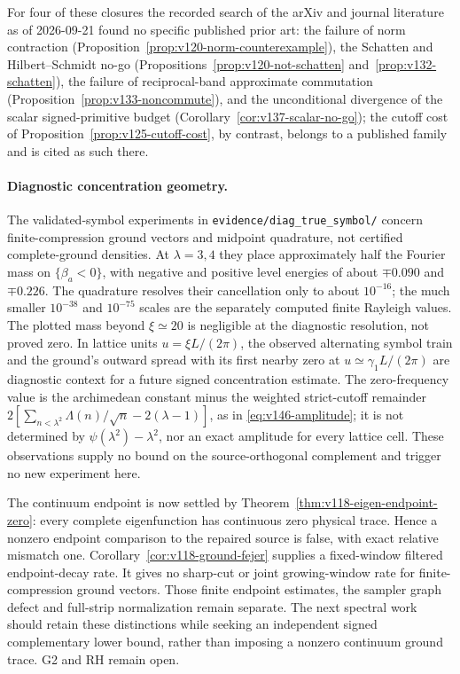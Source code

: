\documentclass[11pt]{article}
\theoremstyle{remark}
\begin{document}
For four of these closures the recorded search of the arXiv and journal literature
as of 2026-09-21 found no specific published prior art: the failure of
norm contraction (Proposition~\ref{prop:v120-norm-counterexample}), the
Schatten and Hilbert--Schmidt no-go
(Propositions~\ref{prop:v120-not-schatten} and~\ref{prop:v132-schatten}),
the failure of reciprocal-band approximate commutation
(Proposition~\ref{prop:v133-noncommute}), and the unconditional
divergence of the scalar signed-primitive budget
(Corollary~\ref{cor:v137-scalar-no-go}); the cutoff cost of
Proposition~\ref{prop:v125-cutoff-cost}, by contrast, belongs to a
published family and is cited as such there.

\paragraph{Diagnostic concentration geometry.}
The validated-symbol experiments in
\nolinkurl{evidence/diag_true_symbol/} concern finite-compression ground
vectors and midpoint quadrature, not certified complete-ground densities.
At $\lambda=3,4$ they place approximately half the Fourier mass on
$\{\beta_a<0\}$, with negative and positive level energies of about
$\mp0.090$ and $\mp0.226$. The quadrature resolves their cancellation
only to about $10^{-16}$; the much smaller $10^{-38}$ and $10^{-75}$
scales are the separately computed finite Rayleigh values.
The plotted mass beyond $\xi\simeq20$ is negligible at the diagnostic
resolution, not proved zero. In lattice units $u=\xi L/(2\pi)$, the
observed alternating symbol train and the ground's outward spread
with its first nearby zero at $u\simeq\gamma_1L/(2\pi)$ are diagnostic
context for a future signed concentration estimate. The zero-frequency
value is the archimedean constant minus the weighted strict-cutoff
remainder $2[\sum_{n<\lambda^2}\Lambda(n)/\sqrt n-2(\lambda-1)]$,
as in \eqref{eq:v146-amplitude}; it is not determined by
$\psi(\lambda^2)-\lambda^2$, nor an exact amplitude for every lattice
cell. These observations supply no bound on the source-orthogonal
complement and trigger no new experiment here.


The continuum endpoint is now settled by
Theorem~\ref{thm:v118-eigen-endpoint-zero}: every complete eigenfunction
has continuous zero physical trace. Hence a nonzero endpoint comparison
to the repaired source is false, with exact relative mismatch one.
Corollary~\ref{cor:v118-ground-fejer} supplies a fixed-window filtered
endpoint-decay rate. It gives no sharp-cut or joint growing-window rate
for finite-compression ground vectors. Those finite endpoint estimates,
the sampler graph defect and full-strip normalization remain separate.
The next spectral work should retain these distinctions while seeking
an independent signed complementary lower bound, rather than imposing
a nonzero continuum ground trace. G2 and RH remain open.
\end{document}
